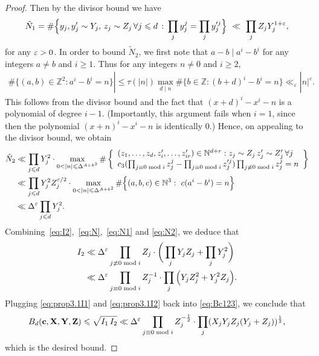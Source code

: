 \begin{proof}
Then by the divisor bound we have
\begin{align}\label{eq:N1}
\tilde{N}_1= \#\Big\{ y_j, y_j'\sim Y_j,\,z_j \sim Z_j\,\forall j\leqslant d\,:\, \prod_{j}y_j^j=\prod_{j}y_j'^j\Big\} \ \ll \ \prod_j Z_j Y_j^{1+\varepsilon},
\end{align}
for any $\varepsilon>0$. In order to  bound $\tilde{N}_2$, we first note that $a-b\mid a^i-b^i$ for any integers $a\neq b$ and $i\geq 1$. Thus for any integers $n\neq 0$ and $i\geq 2$,
\begin{align*}
\#\{(a,b)\in \mathbb{Z}^2:a^i-b^i=n\}|\leq \tau(|n|)\max_{d\mid n}\#\{b\in \mathbb{Z}:(b+d)^i-b^i=n\}\ll_{\varepsilon} |n|^{\varepsilon}.
\end{align*}
This follows from  the divisor bound and the fact that $(x+d)^i-x^i-n$ is a polynomial of degree $i-1$. (Importantly, this argument fails when $i=1$, since then the polynomial $(x+n)^i-x^i-n$ is identically $0$.)
Hence, on appealing to  the divisor bound, we obtain
\begin{align}\label{eq:N2}\begin{split}
\tilde{N}_2&\ll \prod_{j\leq d}Y_j^2\cdot \max_{0<|n|\leq \Delta^{A+k^2}}\#\left\{
\begin{array}{l}
(z_1,\ldots,z_d,z_i',\ldots, z_{ir}')\in \mathbb{N}^{d+r}:
z_j \sim Z_j\,z_j' \sim Z_j'\, \forall j\\
c_3(\prod_{j\equiv 0\bmod i}z_j^j-\prod_{j\equiv 0\bmod i}z_j'^j)\prod_{j\not \equiv 0\bmod i}z_{j}^j=n
\end{array}\right\}\\
&\ll \prod_{j\leq d}Y_j^2Z_j^{\eps/2}\cdot \max_{0<|n|\leq \Delta^{A+k^2}}\#\Big\{(a,b,c)\in \mathbb{N}^{3}:\,\, c(a^i-b^i)=n \Big\}\\
&\ll \Delta^\eps\prod_{j\leq d}Y_j^{2}.
\end{split}
\end{align}
Combining~\eqref{eq:I2},~\eqref{eq:N},~\eqref{eq:N1} and \eqref{eq:N2}, we deduce that
\begin{equation}
\begin{split}
\label{eq:prop3.1I2}
I_2 &\ll \Delta^\varepsilon \prod_{j\not \equiv 0\bmod i}Z_{j} \cdot\bigg(\prod_j Y_j Z_j   + \prod_{j}
Y_j^2 \bigg) \\
&\ll \Delta^\varepsilon \prod_{j\equiv 0\bmod i}Z_j^{-1}\cdot \prod_{j}\Big(Y_jZ_j^{2} + Y_j^2Z_j\Big).
\end{split}\end{equation}
Plugging \eqref{eq:prop3.1I1} and \eqref{eq:prop3.1I2} back into \eqref{eq:Bc123}, we conclude that
\begin{align*}
B_d(\mathbf{c},\mathbf{X},\mathbf{Y},\mathbf{Z})  \leqslant  \sqrt{I_1\,I_2}\ll  \Delta^\varepsilon \prod_{j\equiv 0\bmod i}Z_j^{-\frac{1}{2}}\cdot \prod_{j}(X_jY_jZ_j(Y_j+Z_j))^{\frac{1}{2}},
\end{align*}
which is the desired bound.
\end{proof}


